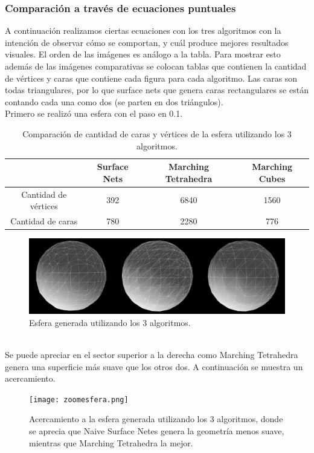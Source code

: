 \documentclass[12pt]{article}
\begin{document}
\subsubsection{Comparación a través de ecuaciones puntuales}
A continuación realizamos ciertas ecuaciones con los tres algoritmos con la intención de observar cómo se comportan, y cuál produce mejores resultados visuales. El orden de las imágenes es análogo a la tabla. Para mostrar esto además de las imágenes comparativas se colocan tablas que contienen la cantidad de vértices y caras que contiene cada figura para cada algoritmo. Las caras son todas triangulares, por lo que surface nets que genera caras rectangulares se están contando cada una como dos (se parten en dos triángulos).
\\Primero se realizó una esfera con el paso en 0.1.
\begin{table}[h!]
  \centering
  \label{tab:table1}
  \begin{tabular}{cccc}
    \toprule
    & Surface Nets & Marching Tetrahedra & Marching Cubes\\
    \midrule
    Cantidad de vértices & 392 & 6840 & 1560\\
    Cantidad de caras & 780 & 2280 & 776\\
    \bottomrule
  \end{tabular}
  \caption{Comparación de cantidad de caras y vértices de la esfera utilizando los 3 algoritmos.}
\end{table}
\begin{figure}[h!]
\includegraphics[width=\linewidth,center]{compec1.png}
\caption{Esfera generada utilizando los 3 algoritmos.}
\end{figure}
\\Se puede apreciar en el sector superior a la derecha como Marching Tetrahedra genera una superficie más suave que los otros dos. A continuación se muestra un acercamiento.
\begin{figure}[h!]
\texttt{[image: zoomesfera.png]}
\caption{Acercamiento a la esfera generada utilizando los 3 algoritmos, donde se aprecia que Naive Surface Netes genera la geometría menos suave, mientras que Marching Tetrahedra la mejor.}
\end{figure}
\end{document}
